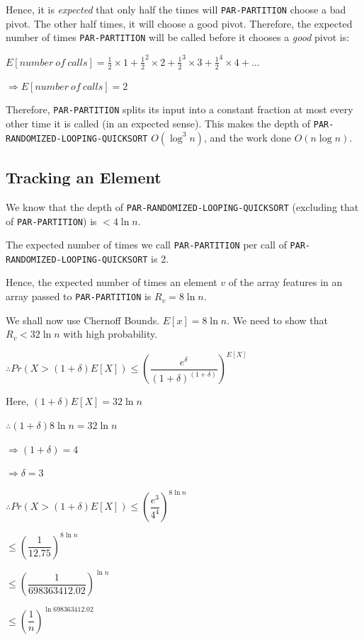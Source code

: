 \documentclass{article}
\begin{document}
Hence, it is \textit{expected} that only half the times will
\texttt{PAR-PARTITION} choose a bad pivot. The other half times, it
will choose a good pivot. Therefore, the expected number of times
\texttt{PAR-PARTITION} will be called before it chooses a
\textit{good} pivot is:

$E[number\ of\ calls] = \frac{1}{2} \times 1 + \frac{1}{2}^2 \times 2 +
\frac{1}{2}^3 \times 3 + \frac{1}{2}^4 \times 4 + \ldots$

$\Rightarrow E[number\ of\ calls] = 2$

Therefore, \texttt{PAR-PARTITION} splits its input into a constant
fraction at most every other time it is called (in an expected
sense). This makes the depth of
\texttt{PAR-RANDOMIZED-LOOPING-QUICKSORT} $O(\log^{3}{n})$, and the
work done $O(n\log{n})$.

\subsection{Tracking an Element}

We know that the depth of \texttt{PAR-RANDOMIZED-LOOPING-QUICKSORT}
(excluding that of \texttt{PAR-PARTITION}) is $< 4\ln{n}$.

The expected number of times we call \texttt{PAR-PARTITION} per call
of \texttt{PAR-RANDOMIZED-LOOPING-QUICKSORT} is 2.

Hence, the expected number of times an element $v$ of the array
features in an array passed to \texttt{PAR-PARTITION} is $R_v =
8\ln{n}$.

We shall now use Chernoff Bounds. $E[x] = 8\ln{n}$. We need to show
that $R_v < 32\ln{n}$ with high probability.

$\therefore Pr(X > (1 + \delta)E[X]) \le 
\left(\dfrac{e^\delta}{(1+\delta)^{(1+\delta)}}\right)^{E[X]}$

Here, $(1 + \delta)E[X] = 32\ln{n}$

$\therefore (1+\delta)8\ln{n} = 32\ln{n}$

$\Rightarrow (1+\delta) = 4$

$\Rightarrow \delta = 3$

$\therefore Pr(X > (1 + \delta)E[X]) \le 
\left(\dfrac{e^3}{4^4}\right)^{8\ln{n}}$

$\le \left(\dfrac{1}{12.75}\right)^{8\ln{n}}$

$\le \left(\dfrac{1}{698363412.02}\right)^{\ln{n}}$

$\le \left(\dfrac{1}{n}\right)^{\ln{698363412.02}}$
\end{document}
